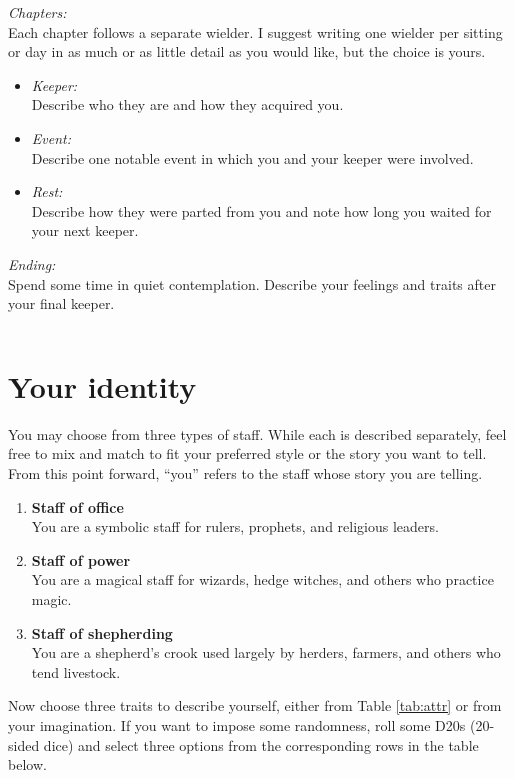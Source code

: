 \documentclass[
  a5paper,
]{article}
\begin{document}
\emph{Chapters:}\\
Each chapter follows a separate wielder. I suggest writing one wielder per sitting or day in as much or as little detail as you would like, but the choice is yours.

\begin{itemize}
\item
  \emph{Keeper:}\\
  Describe who they are and how they acquired you.
\item
  \emph{Event:}\\
  Describe one notable event in which you and your keeper were involved.
\item
  \emph{Rest:}\\
  Describe how they were parted from you and note how long you waited for your next keeper.
\end{itemize}

\emph{Ending:}\\
Spend some time in quiet contemplation. Describe your feelings and traits after your final keeper.

\pagebreak

\(~\)

\hypertarget{your-identity}{%
\section{Your identity}\label{your-identity}}

You may choose from three types of staff. While each is described separately, feel free to mix and match to fit your preferred style or the story you want to tell. From this point forward, ``you'' refers to the staff whose story you are telling.

\begin{enumerate}
\def\labelenumi{\arabic{enumi}.}
\item
  \textbf{Staff of office}\\
  You are a symbolic staff for rulers, prophets, and religious leaders.
\item
  \textbf{Staff of power}\\
  You are a magical staff for wizards, hedge witches, and others who practice magic.
\item
  \textbf{Staff of shepherding}\\
  You are a shepherd's crook used largely by herders, farmers, and others who tend livestock.
\end{enumerate}

Now choose three traits to describe yourself, either from Table \ref{tab:attr} or from your imagination. If you want to impose some randomness, roll some D20s (20-sided dice) and select three options from the corresponding rows in the table below.
\end{document}
